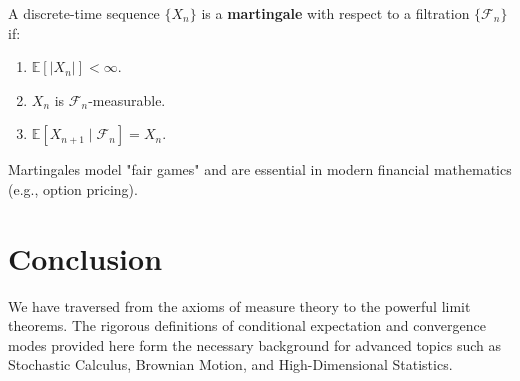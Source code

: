 \documentclass[oneside]{book}
\begin{document}
\begin{definition}[Martingale]
A discrete-time sequence $\{X_n\}$ is a \textbf{martingale} with respect to a filtration $\{\mathcal{F}_n\}$ if:
\begin{enumerate}
    \item $\mathbb{E}[|X_n|] < \infty$.
    \item $X_n$ is $\mathcal{F}_n$-measurable.
    \item $\mathbb{E}[X_{n+1} \mid \mathcal{F}_n] = X_n$.
\end{enumerate}
Martingales model "fair games" and are essential in modern financial mathematics (e.g., option pricing).
\end{definition}

\section{Conclusion}
We have traversed from the axioms of measure theory to the powerful limit theorems. The rigorous definitions of conditional expectation and convergence modes provided here form the necessary background for advanced topics such as Stochastic Calculus, Brownian Motion, and High-Dimensional Statistics.
\end{document}
